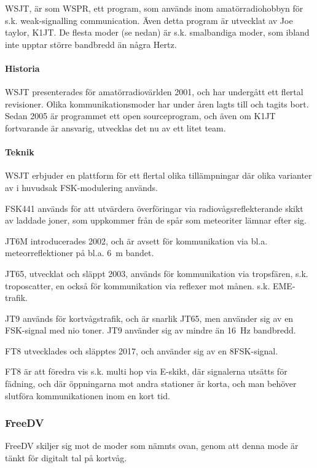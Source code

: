 WSJT, är som WSPR, ett program, som används inom amatörradiohobbyn för s.k.
weak-signalling communication. 
Även detta program är utvecklat av Joe taylor, K1JT.
De flesta moder (se nedan) är s.k. smalbandiga moder, som ibland inte upptar
större bandbredd än några Hertz.

\paragraph{Historia}

WSJT presenterades för amatörradiovärlden 2001, och har undergått ett flertal
revisioner.
Olika kommunikationsmoder har under åren lagts till och tagits bort.
Sedan 2005 är programmet ett open sourceprogram, och även om K1JT fortvarande
är ansvarig, utvecklas det nu av ett litet team.

\paragraph{Teknik}

WSJT erbjuder en plattform för ett flertal olika tillämpningar där olika
varianter av i huvudsak FSK-modulering används.

FSK441 används för att utvärdera överföringar via radiovågsreflekterande skikt
av laddade joner, som uppkommer från de spår som meteoriter lämnar efter sig.

JT6M introducerades 2002, och är avsett för kommunikation via bl.a.
meteorreflektioner på bl.a. 6~m bandet.

JT65, utvecklat och släppt 2003, används för kommunikation via tropsfären, s.k.
troposcatter, en också för kommunikation via reflexer mot månen. s.k.
EME-trafik.

JT9 används för kortvågstrafik, och är snarlik JT65, men använder sig av en
FSK-signal med nio toner.
JT9 använder sig av mindre än 16~Hz bandbredd.

FT8 utvecklades och släpptes 2017, och använder sig av en 8FSK-signal. 

FT8 är att föredra vis s.k. multi hop via E-skikt, där signalerna utsätts för
fädning, och där öppningarna mot andra stationer är korta, och man behöver
slutföra kommunikationen inom en kort tid.

\subsubsection{FreeDV}

FreeDV skiljer sig mot de moder som nämnts ovan, genom att denna mode är tänkt
för digitalt tal på kortvåg.

